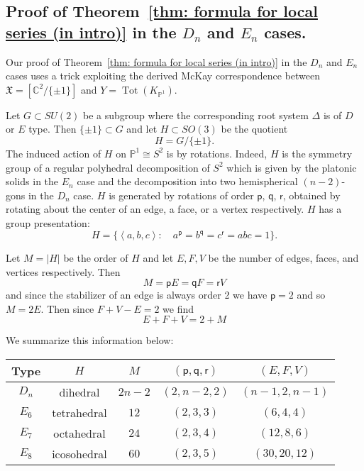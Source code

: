 \documentclass{amsart}
\theoremstyle{definition}
\newcommand{\CC} {{\mathbb C}}          %
\newcommand{\PP}{\mathbb{P}}
\newcommand{\X}{\mathfrak{X}}
\newcommand{\varp}{\mathsf{p}}
\newcommand{\varq}{\mathsf{q}}
\newcommand{\varr}{\mathsf{r}}
\begin{document}
\subsection{Proof of Theorem~\ref{thm: formula for local series (in
intro)} in the $D_{n}$ and $E_{n}$ cases.}\label{subsec: proof of Dn
and En cases of local series}

Our proof of Theorem~\ref{thm: formula for local series (in intro)} in
the $D_{n}$ and $E_{n}$ cases uses a trick exploiting the derived
McKay correspondence between $\X =[\CC^{2}/\{\pm 1 \}]$ and
$Y=\operatorname{Tot}(K_{\PP^{1}})$. 

Let $G\subset SU(2)$ be a subgroup where the corresponding root system
$\Delta$ is of $D$ or $E$ type. Then $\{\pm 1 \}\subset G$ and let
$H\subset SO(3)$ be the quotient
\[
H=G/\{\pm 1 \}.
\]
The induced action of $H$ on $\PP^{1}\cong S^{2}$ is by
rotations. Indeed, $H$ is the symmetry group of a regular polyhedral
decomposition of $S^{2}$ which is given by the platonic solids in the
$E_{n}$ case and the decomposition into two hemispherical $(n-2)$-gons
in the $D_{n}$ case. $H$ is generated by rotations of order $\varp$,
$\varq$, $\varr$, obtained by rotating about the center of an edge, a
face, or a vertex respectively. $H$ has a group presentation:
\[
H=\{\left\langle a,b,c \right\rangle :\quad a^{\varp} = b^{\varq} =
c^{\varr} = abc=1 \}.
\]

Let $M=|H|$ be the order of $H$ and let $E,F,V$ be the number of
edges, faces, and vertices respectively. Then
\[
M=\varp E = \varq F = \varr V
\]
and since the stabilizer of an edge is always order 2 we have $\varp =2$
and so $M=2E$. Then since $F+V-E=2$ we find
\[
E+F+V = 2 + M
\]

We summarize this information below:

\begin{center}
\begin{tabular}{|c|c|c|c|c|}
\hline
Type &	$H$ &	$M$&	$(\varp ,\varq ,\varr )$ &	$(E,F,V)$\\ \hline \hline 
$D_{n}$     & dihedral & $2n-2$ & $(2,n-2,2)$& $(n-1,2,n-1)$	\\ \hline
$E_{6}$     & tetrahedral & $12$ & $(2,3,3)$& $(6,4,4)$	\\ \hline
$E_{7}$     & octahedral & $24$ & $(2,3,4)$& $(12,8,6)$	\\ \hline
$E_{8}$     & icosohedral & $60$ & $(2,3,5)$& $(30,20,12)$	\\ \hline
\end{tabular}
\end{center}
\end{document}
